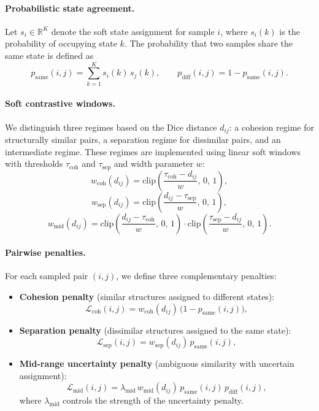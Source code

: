 \documentclass[11pt]{article}
\begin{document}
\paragraph{Probabilistic state agreement.}
Let $s_i \in \mathbb{R}^K$ denote the soft state assignment for sample $i$, where $s_i(k)$ is the probability of occupying state $k$. The probability that two samples share the same state is defined as
\[
p_{\mathrm{same}}(i,j) = \sum_{k=1}^K s_i(k)\, s_j(k),
\qquad
p_{\mathrm{diff}}(i,j) = 1 - p_{\mathrm{same}}(i,j).
\]

\paragraph{Soft contrastive windows.}
We distinguish three regimes based on the Dice distance $d_{ij}$: a cohesion regime for structurally similar pairs, a separation regime for dissimilar pairs, and an intermediate regime. These regimes are implemented using linear soft windows with thresholds $\tau_{\mathrm{coh}}$ and $\tau_{\mathrm{sep}}$ and width parameter $w$:
\[
w_{\mathrm{coh}}(d_{ij}) =
\mathrm{clip}\!\left(\frac{\tau_{\mathrm{coh}} - d_{ij}}{w},\,0,\,1\right),
\]
\[
w_{\mathrm{sep}}(d_{ij}) =
\mathrm{clip}\!\left(\frac{d_{ij} - \tau_{\mathrm{sep}}}{w},\,0,\,1\right),
\]
\[
w_{\mathrm{mid}}(d_{ij}) =
\mathrm{clip}\!\left(\frac{d_{ij} - \tau_{\mathrm{coh}}}{w},\,0,\,1\right)
\cdot
\mathrm{clip}\!\left(\frac{\tau_{\mathrm{sep}} - d_{ij}}{w},\,0,\,1\right).
\]

\paragraph{Pairwise penalties.}
For each sampled pair $(i,j)$, we define three complementary penalties:
\begin{itemize}
\item \textbf{Cohesion penalty} (similar structures assigned to different states):
\[
\mathcal{L}_{\mathrm{coh}}(i,j)
=
w_{\mathrm{coh}}(d_{ij}) \, \bigl(1 - p_{\mathrm{same}}(i,j)\bigr),
\]
\item \textbf{Separation penalty} (dissimilar structures assigned to the same state):
\[
\mathcal{L}_{\mathrm{sep}}(i,j)
=
w_{\mathrm{sep}}(d_{ij}) \, p_{\mathrm{same}}(i,j),
\]
\item \textbf{Mid-range uncertainty penalty} (ambiguous similarity with uncertain assignment):
\[
\mathcal{L}_{\mathrm{mid}}(i,j)
=
\lambda_{\mathrm{mid}}\,
w_{\mathrm{mid}}(d_{ij})\,
p_{\mathrm{same}}(i,j)\, p_{\mathrm{diff}}(i,j),
\]
where $\lambda_{\mathrm{mid}}$ controls the strength of the uncertainty penalty.
\end{itemize}
\end{document}
